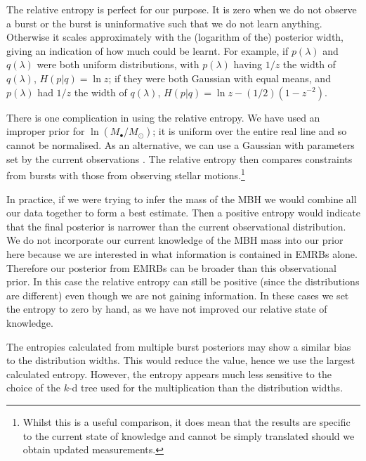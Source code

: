 The relative entropy is perfect for our purpose. It is zero when we do not observe a burst or the burst is uninformative such that we do not learn anything. Otherwise it scales approximately with the (logarithm of the) posterior width, giving an indication of how much could be learnt. For example, if $p(\lambda)$ and $q(\lambda)$ were both uniform distributions, with $p(\lambda)$ having $1/z$ the width of $q(\lambda)$, $H(p|q) = \ln z$; if they were both Gaussian with equal means, and $p(\lambda)$ had $1/z$ the width of $q(\lambda)$, $H(p|q) = \ln z - (1/2)(1 - z^{-2})$.

There is one complication in using the relative entropy. We have used an improper prior for $\ln (M_\bullet/M_\odot)$; it is uniform over the entire real line and so cannot be normalised. As an alternative, we can use a Gaussian with parameters set by the current observations \citep{Gillessen2009}. The relative entropy then compares constraints from bursts with those from observing stellar motions.\footnote{Whilst this is a useful comparison, it does mean that the results are specific to the current state of knowledge and cannot be simply translated should we obtain updated measurements.}

In practice, if we were trying to infer the mass of the MBH we would combine all our data together to form a best estimate. Then a positive entropy would indicate that the final posterior is narrower than the current observational distribution. We do not incorporate our current knowledge of the MBH mass into our prior here because we are interested in what information is contained in EMRBs alone. Therefore our posterior from EMRBs can be broader than this observational prior. In this case the relative entropy can still be positive (since the distributions are different) even though we are not gaining information. In these cases we set the entropy to zero by hand, as we have not improved our relative state of knowledge.

The entropies calculated from multiple burst posteriors may show a similar bias to the distribution widths. This would reduce the value, hence we use the largest calculated entropy. However, the entropy appears much less sensitive to the choice of the $k$-d tree used for the multiplication than the distribution widths. %

